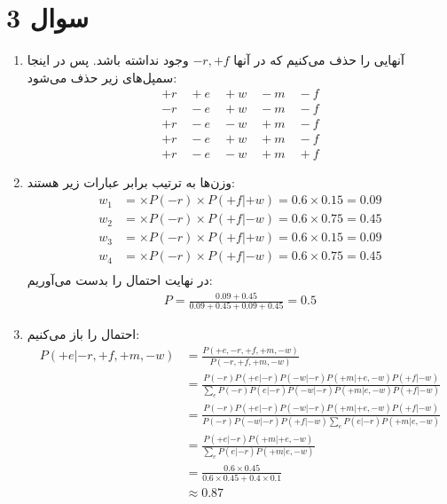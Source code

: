 \section*{سوال 3}
\begin{enumerate}
    \item آنهایی را حذف می‌کنیم که در آنها
    $-r, +f$
    وجود نداشته باشد. پس در اینجا سمپل‌های زیر حذف می‌شود:
    \begin{gather*}
        +r \quad +e \quad +w \quad -m \quad -f\\
        -r \quad -e \quad +w \quad -m \quad -f\\
        +r \quad -e \quad -w \quad +m \quad -f\\
        +r \quad -e \quad +w \quad +m \quad -f\\
        +r \quad -e \quad -w \quad +m \quad +f
    \end{gather*}
    \item وزن‌ها به ترتیب برابر عبارات زیر هستند:
    \begin{align*} %
        w_1 &= \times P(-r) \times P(+f | +w) = 0.6 \times 0.15 = 0.09\\
        w_2 &= \times P(-r) \times P(+f | -w) = 0.6 \times 0.75 = 0.45\\
        w_3 &= \times P(-r) \times P(+f | +w) = 0.6 \times 0.15 = 0.09\\
        w_4 &= \times P(-r) \times P(+f | -w) = 0.6 \times 0.75 = 0.45\\
    \end{align*}
    در نهایت احتمال‌ را بدست می‌آوریم:
    \begin{gather*}
        P = \frac{0.09 + 0.45}{0.09 + 0.45 + 0.09 + 0.45} = 0.5
    \end{gather*}
    \item احتمال را باز می‌کنیم:
    \begin{align*}
        P(+e | -r, +f, +m, -w) &= \frac{P(+e, -r, +f, +m, -w)}{P(-r, +f, +m, -w)}\\
        &= \frac{P(-r) P(+e | -r) P(-w | -r) P(+m | +e, -w) P(+f | -w)}{\sum_{e} P(-r) P(e | -r) P(-w | -r) P(+m | e, -w) P(+f | -w)}\\
        &= \frac{P(-r) P(+e | -r) P(-w | -r) P(+m | +e, -w) P(+f | -w)}{P(-r) P(-w | -r) P(+f | -w) \sum_{e} P(e | -r) P(+m | e, -w)}\\
        &= \frac{P(+e | -r) P(+m | +e, -w)}{\sum_{e} P(e | -r) P(+m | e, -w)}\\
        &= \frac{0.6 \times 0.45}{0.6 \times 0.45 + 0.4 \times 0.1}\\
        &\approx 0.87
    \end{align*}
\end{enumerate}